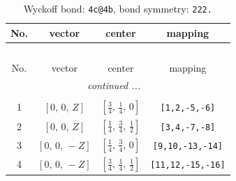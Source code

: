 \documentclass[fleqn,8pt]{jsarticle}
\begin{document}
\renewcommand{\arraystretch}{1.2}
\begin{longtable}{cccc}
\caption{Wyckoff bond: {\tt 4c@4b}, bond symmetry: {\tt 222.}}
 \\
 \hline \hline
No. & vector & center & mapping \\ \hline \endfirsthead

\multicolumn{3}{l}{\tablename\ \thetable{}} \\
 \hline \hline
No. & vector & center & mapping \\ \hline \endhead

 \hline \hline
\multicolumn{3}{r}{\footnotesize\it continued ...} \\ \endfoot

 \hline \hline
\multicolumn{3}{r}{} \\ \endlastfoot

1 & $\left[ 0,\, 0,\, Z \right]$ & $\left[ \frac{3}{4},\, \frac{1}{4},\, 0 \right]$ & {\tt [1,2,-5,-6]} \\ \hline
2 & $\left[ 0,\, 0,\, Z \right]$ & $\left[ \frac{1}{4},\, \frac{3}{4},\, \frac{1}{2} \right]$ & {\tt [3,4,-7,-8]} \\ \hline
3 & $\left[ 0,\, 0,\, - Z \right]$ & $\left[ \frac{1}{4},\, \frac{3}{4},\, 0 \right]$ & {\tt [9,10,-13,-14]} \\ \hline
4 & $\left[ 0,\, 0,\, - Z \right]$ & $\left[ \frac{3}{4},\, \frac{1}{4},\, \frac{1}{2} \right]$ & {\tt [11,12,-15,-16]} \\
\end{longtable}
\renewcommand{\arraystretch}{1.2}
\end{document}
